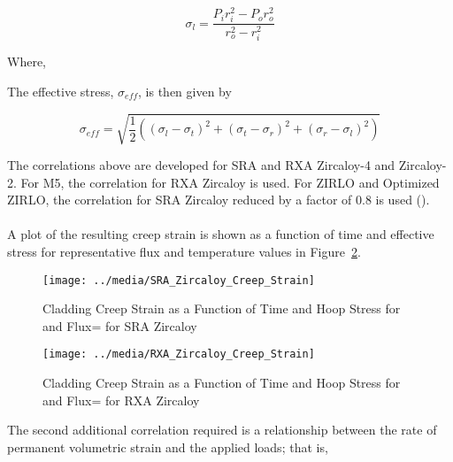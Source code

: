 \begin{equation}
    \label{eq:principle_stress_hoop}
    \sigma_{l} = \frac{P_{i}r_{i}^{2}  - P_{o}r_{o}^{2} }{r_{o}^{2}- r_{i}^{2}}
\end{equation}

Where,

The effective stress, $\sigma_{eff}$, is then given by

\begin{equation}
    \label{eq:effective_stress}
    \sigma_{eff} = \sqrt{\frac{1}{2}\left(\left(\sigma_{l}-\sigma_{t}\right)^{2} 
    + \left(\sigma_{t}-\sigma_{r}\right)^{2} + \left(\sigma_{r}-\sigma_{l}\right)^{2} \right)}
\end{equation}

The correlations above are developed for SRA and RXA Zircaloy-4 and Zircaloy-2. For M5, the
correlation for RXA Zircaloy is used. For ZIRLO and Optimized ZIRLO, the correlation for SRA
Zircaloy reduced by a factor of 0.8 is used (\cite{ref:Sabol1994b}).
\\
\\
A plot of the resulting creep strain is shown as a function of time and effective stress for
representative flux and temperature values in Figure~\ref{fig:creep_strain_function_of_time}.

\begin{figure}
    \texttt{[image: ../media/SRA\_Zircaloy\_Creep\_Strain]}
    \caption{Cladding Creep Strain as a Function of Time and Hoop Stress for  and Flux= for SRA Zircaloy}
    \label{fig:creep_strain_function_of_time}
\end{figure}

\begin{figure}
    \texttt{[image: ../media/RXA\_Zircaloy\_Creep\_Strain]}
    \caption{Cladding Creep Strain as a Function of Time and Hoop Stress for  and Flux= for RXA Zircaloy}
    \label{fig:creep_strain_function_of_time}
\end{figure}

The second additional correlation required is a relationship between the rate of permanent
volumetric strain and the applied loads; that is,

